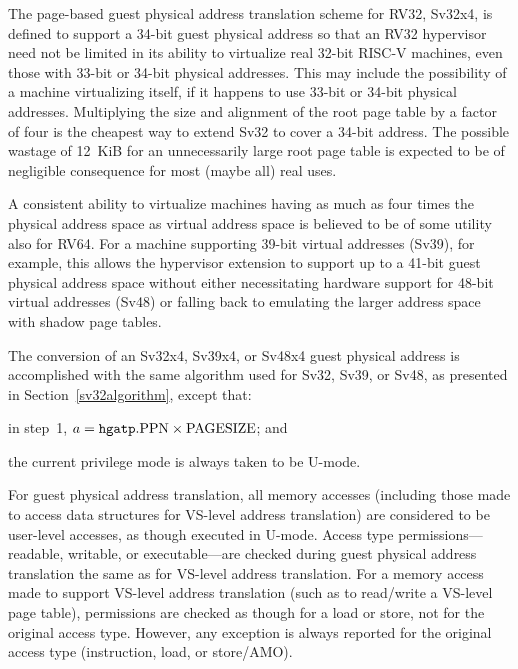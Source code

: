 \begin{commentary}
The page-based guest physical address translation scheme for RV32, Sv32x4, is
defined to support a 34-bit guest physical address so that an RV32 hypervisor
need not be limited in its ability to virtualize real 32-bit RISC-V machines,
even those with 33-bit or 34-bit physical addresses.
This may include the possibility of a machine virtualizing itself, if it
happens to use 33-bit or 34-bit physical addresses.
Multiplying the size and alignment of the root page table by a factor of four
is the cheapest way to extend Sv32 to cover a 34-bit address.
The possible wastage of 12~KiB for an unnecessarily large root page table is
expected to be of negligible consequence for most (maybe all) real uses.

A consistent ability to virtualize machines having as much as four times the
physical address space as virtual address space is believed to be of some
utility also for RV64.
For a machine supporting 39-bit virtual addresses (Sv39), for example, this
allows the hypervisor extension to support up to a 41-bit guest physical
address space without either necessitating hardware support for 48-bit virtual
addresses (Sv48) or falling back to emulating the larger address space with
shadow page tables.
\end{commentary}

The conversion of an Sv32x4, Sv39x4, or Sv48x4 guest physical address is
accomplished with the same algorithm used for Sv32, Sv39, or Sv48, as presented
in Section~\ref{sv32algorithm}, except that:
\begin{compactitem}
\item
in step~1, $a = \mbox{{\tt hgatp}.PPN}\times\mbox{PAGESIZE}$; and
\item
the current privilege mode is always taken to be U-mode.
\end{compactitem}

For guest physical address translation, all memory accesses (including those
made to access data structures for VS-level address translation) are considered
to be user-level accesses, as though executed in U-mode.
Access type permissions---readable, writable, or executable---are checked
during guest physical address translation the same as for VS-level address
translation.
For a memory access made to support VS-level address translation (such as to
read/write a VS-level page table), permissions are checked as though for a load
or store, not for the original access type.
However, any exception is always reported for the original access type
(instruction, load, or store/AMO).

